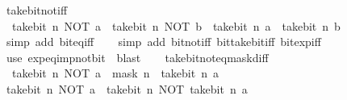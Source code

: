 \begin{isabellebody}
\endisatagproof
{\isafoldproof}%
%
\isadelimproof
\isanewline
%
\endisadelimproof
\isanewline
{}\isamarkupfalse%
\ take{\isacharunderscore}{\kern0pt}bit{\isacharunderscore}{\kern0pt}not{\isacharunderscore}{\kern0pt}iff{\isacharcolon}{\kern0pt}\isanewline
\ \ {\isacartoucheopen}take{\isacharunderscore}{\kern0pt}bit\ n\ {\isacharparenleft}{\kern0pt}NOT\ a{\isacharparenright}{\kern0pt}\ {\isacharequal}{\kern0pt}\ take{\isacharunderscore}{\kern0pt}bit\ n\ {\isacharparenleft}{\kern0pt}NOT\ b{\isacharparenright}{\kern0pt}\ {\isasymlongleftrightarrow}\ take{\isacharunderscore}{\kern0pt}bit\ n\ a\ {\isacharequal}{\kern0pt}\ take{\isacharunderscore}{\kern0pt}bit\ n\ b{\isacartoucheclose}\isanewline
%
\isadelimproof
\ \ %
\endisadelimproof
%
\isatagproof
{}\isamarkupfalse%
\ {\isacharparenleft}{\kern0pt}simp\ add{\isacharcolon}{\kern0pt}\ bit{\isacharunderscore}{\kern0pt}eq{\isacharunderscore}{\kern0pt}iff{\isacharparenright}{\kern0pt}\isanewline
\ \ \isamarkupfalse%
\ {\isacharparenleft}{\kern0pt}simp\ add{\isacharcolon}{\kern0pt}\ bit{\isacharunderscore}{\kern0pt}not{\isacharunderscore}{\kern0pt}iff\ bit{\isacharunderscore}{\kern0pt}take{\isacharunderscore}{\kern0pt}bit{\isacharunderscore}{\kern0pt}iff\ bit{\isacharunderscore}{\kern0pt}exp{\isacharunderscore}{\kern0pt}iff{\isacharparenright}{\kern0pt}\isanewline
\ \ \isamarkupfalse%
\ {\isacharparenleft}{\kern0pt}use\ exp{\isacharunderscore}{\kern0pt}eq{\isacharunderscore}{\kern0pt}{}{\isacharunderscore}{\kern0pt}imp{\isacharunderscore}{\kern0pt}not{\isacharunderscore}{\kern0pt}bit\ \ blast{\isacharparenright}{\kern0pt}\isanewline
\ \ \isamarkupfalse%
%
\endisatagproof
{\isafoldproof}%
%
\isadelimproof
\isanewline
%
\endisadelimproof
\isanewline
{}\isamarkupfalse%
\ take{\isacharunderscore}{\kern0pt}bit{\isacharunderscore}{\kern0pt}not{\isacharunderscore}{\kern0pt}eq{\isacharunderscore}{\kern0pt}mask{\isacharunderscore}{\kern0pt}diff{\isacharcolon}{\kern0pt}\isanewline
\ \ {\isacartoucheopen}take{\isacharunderscore}{\kern0pt}bit\ n\ {\isacharparenleft}{\kern0pt}NOT\ a{\isacharparenright}{\kern0pt}\ {\isacharequal}{\kern0pt}\ mask\ n\ {\isacharminus}{\kern0pt}\ take{\isacharunderscore}{\kern0pt}bit\ n\ a{\isacartoucheclose}\isanewline
%
\isadelimproof
%
\endisadelimproof
%
\isatagproof
{}\isamarkupfalse%
\ {\isacharminus}{\kern0pt}\isanewline
\ \ \isamarkupfalse%
\ {\isacartoucheopen}take{\isacharunderscore}{\kern0pt}bit\ n\ {\isacharparenleft}{\kern0pt}NOT\ a{\isacharparenright}{\kern0pt}\ {\isacharequal}{\kern0pt}\ take{\isacharunderscore}{\kern0pt}bit\ n\ {\isacharparenleft}{\kern0pt}NOT\ {\isacharparenleft}{\kern0pt}take{\isacharunderscore}{\kern0pt}bit\ n\ a{\isacharparenright}{\kern0pt}{\isacharparenright}{\kern0pt}{\isacartoucheclose}\isanewline

\end{isabellebody}
